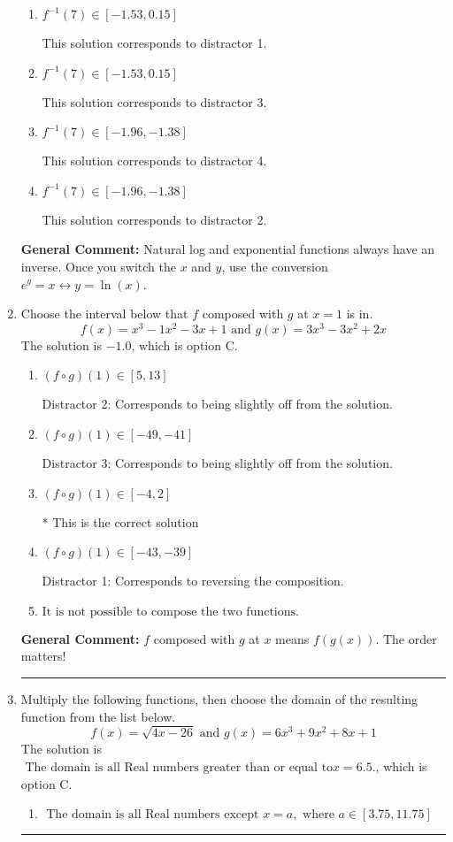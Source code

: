 \documentclass{extbook}[14pt]
\newcommand{\litem}[1]{\item #1

\rule{\textwidth}{0.4pt}}
\begin{document}
\begin{enumerate}
{\begin{enumerate}[label=\Alph*.]
 This is the solution.
\item \( f^{-1}(7) \in [-1.53, 0.15] \)

 This solution corresponds to distractor 1.
\item \( f^{-1}(7) \in [-1.53, 0.15] \)

 This solution corresponds to distractor 3.
\item \( f^{-1}(7) \in [-1.96, -1.38] \)

 This solution corresponds to distractor 4.
\item \( f^{-1}(7) \in [-1.96, -1.38] \)

 This solution corresponds to distractor 2.
\end{enumerate}

\textbf{General Comment:} Natural log and exponential functions always have an inverse. Once you switch the $x$ and $y$, use the conversion $ e^y = x \leftrightarrow y=\ln(x)$.
}
\litem{
Choose the interval below that $f$ composed with $g$ at $x=1$ is in.
\[ f(x) = x^{3} -1 x^{2} -3 x + 1 \text{ and } g(x) = 3x^{3} -3 x^{2} +2 x \]The solution is \( -1.0 \), which is option C.\begin{enumerate}[label=\Alph*.]
\item \( (f \circ g)(1) \in [5, 13] \)

 Distractor 2: Corresponds to being slightly off from the solution.
\item \( (f \circ g)(1) \in [-49, -41] \)

 Distractor 3: Corresponds to being slightly off from the solution.
\item \( (f \circ g)(1) \in [-4, 2] \)

* This is the correct solution
\item \( (f \circ g)(1) \in [-43, -39] \)

 Distractor 1: Corresponds to reversing the composition.
\item \( \text{It is not possible to compose the two functions.} \)


\end{enumerate}

\textbf{General Comment:} $f$ composed with $g$ at $x$ means $f(g(x))$. The order matters!
}
\litem{
Multiply the following functions, then choose the domain of the resulting function from the list below.
\[ f(x) = \sqrt{4x-26}  \text{ and } g(x) = 6x^{3} +9 x^{2} +8 x + 1 \]The solution is \( \text{ The domain is all Real numbers greater than or equal to} x = 6.5. \), which is option C.\begin{enumerate}[label=\Alph*.]
\item \( \text{ The domain is all Real numbers except } x = a, \text{ where } a \in [3.75, 11.75] \)



\end{enumerate}}
\end{enumerate}
\end{document}
